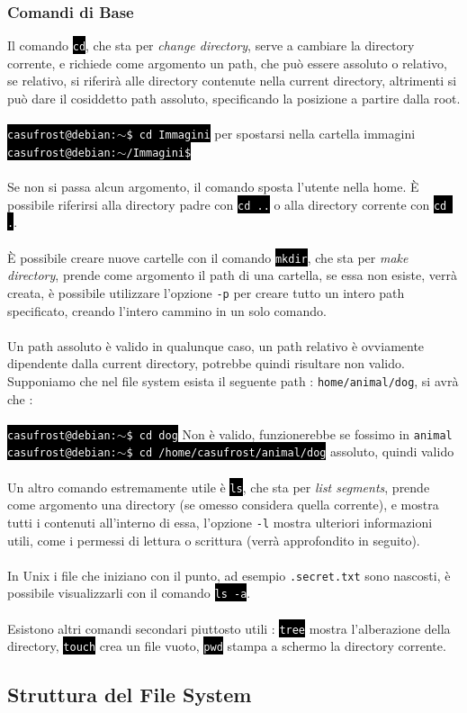 \documentclass[12pt, letterpaper]{article}
\makeatletter
\newcommand{\code}[1]{\colorbox{light-gray}{\texttt{#1}}}
\newcommand{\shelll}[1]{\colorbox{black}{\textcolor{white}{\texttt{#1}}}}
\newcommand{\shell}[1]{\colorbox{black}{\textcolor{white}{\texttt{casufrost@debian:$\sim$\$ #1}}}}
\newcommand{\acc}{\\\hphantom{}\\}
\newcommand{\spaz}{{\hphantom{spazio} }}
\makeatother
\begin{document}
\subsubsection{Comandi di Base}
Il comando \shelll{cd}, che sta per \textit{change directory}, serve a cambiare la directory corrente, e richiede come 
argomento un path, che può essere assoluto o relativo, se relativo, si riferirà alle directory contenute nella current directory, altrimenti 
si può dare il cosiddetto path assoluto, specificando la posizione a partire dalla root.\acc 
\shell{cd Immagini}\spaz per spostarsi nella cartella immagini\\
\shelll{casufrost@debian:$\sim$/Immagini\$}\acc 
Se non si passa alcun argomento, il comando sposta l'utente nella home. È possibile riferirsi alla directory padre 
con \shelll{cd ..} o alla directory corrente con \shelll{cd .}.\acc 
È possibile creare nuove cartelle con il comando \shelll{mkdir}, che sta per \textit{make directory}, prende come argomento 
il path di una cartella, se essa non esiste, verrà creata, è possibile utilizzare l'opzione \code{-p} per creare 
tutto un intero path specificato, creando l'intero cammino in un solo comando.\acc Un path assoluto è valido in qualunque caso, un 
path relativo è ovviamente dipendente dalla current directory, potrebbe quindi risultare non valido. Supponiamo che nel file 
system esista il seguente path : \code{home/animal/dog}, si avrà che : \acc 
\shell{cd dog} Non è valido, funzionerebbe se fossimo in \code{animal}\\
\shell{cd /home/casufrost/animal/dog} assoluto, quindi valido\acc 
Un altro comando estremamente utile è \shelll{ls}, che sta per \textit{list segments}, prende come argomento una directory (se 
omesso considera quella corrente), e mostra tutti i contenuti all'interno di essa, l'opzione \code{-l} mostra ulteriori informazioni 
utili, come i permessi di lettura o scrittura (verrà approfondito in seguito). \acc 
In Unix i file che iniziano con il punto, ad esempio \code{.secret.txt} sono nascosti, è possibile visualizzarli con il 
comando \shelll{ls -a}.\acc 
Esistono altri comandi secondari piuttosto utili : \shelll{tree} mostra l'alberazione della directory, \shelll{touch} crea 
un file vuoto, \shelll{pwd} stampa a schermo la directory corrente.
\subsection{Struttura del File System}
\end{document}
